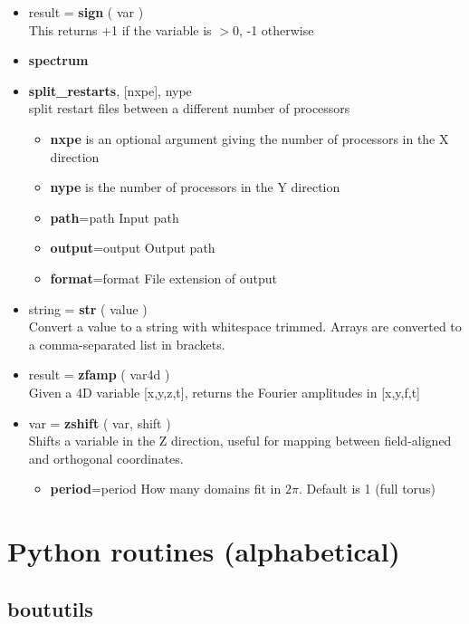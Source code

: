 \documentclass[12pt]{article}
\begin{document}
\begin{itemize}
\item result = {\bf sign} ( var ) \\
  This returns +1 if the variable is $> 0$, -1 otherwise
\item {\bf spectrum}
\item {\bf split\_restarts}, [nxpe], nype \\
  split restart files between a different number of processors
  \begin{itemize}
  \item {\bf nxpe} is an optional argument giving the number of
    processors in the X direction
  \item {\bf nype} is the number of processors in the Y direction
  \item {\bf path}=path      Input path
  \item {\bf output}=output  Output path
  \item {\bf format}=format  File extension of output
  \end{itemize}
\item string = {\bf str} ( value ) \\
  Convert a value to a string with whitespace trimmed. Arrays are
  converted to a comma-separated list in brackets.
\item result = {\bf zfamp} ( var4d )\\
  Given a 4D variable [x,y,z,t], returns the Fourier amplitudes in [x,y,f,t]
\item var = {\bf zshift} ( var, shift ) \\
  Shifts a variable in the Z direction, useful for mapping between field-aligned and orthogonal
  coordinates.
  \begin{itemize}
  \item {\bf period}=period  How many domains fit in $2\pi$. Default is 1 (full torus)
  \end{itemize}
\end{itemize}

\section{Python routines (alphabetical)}
\label{apx:py_routines}

\subsection{boututils}
\end{document}
